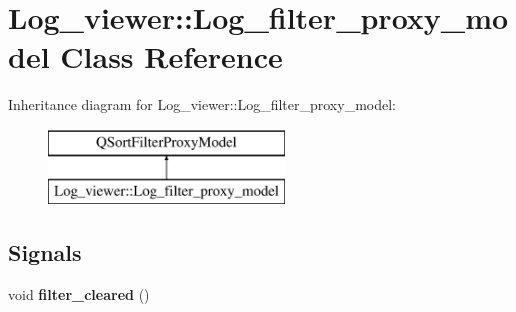 \hypertarget{class_log__viewer_1_1_log__filter__proxy__model}{\section{Log\-\_\-viewer\-:\-:Log\-\_\-filter\-\_\-proxy\-\_\-model Class Reference}
\label{class_log__viewer_1_1_log__filter__proxy__model}
}
Inheritance diagram for Log\-\_\-viewer\-:\-:Log\-\_\-filter\-\_\-proxy\-\_\-model\-:\begin{figure}[H]
\begin{center}
\leavevmode
\includegraphics[height=2.000000cm]{class_log__viewer_1_1_log__filter__proxy__model}
\end{center}
\end{figure}
\subsection*{Signals}
\begin{DoxyCompactItemize}
\item 
\hypertarget{class_log__viewer_1_1_log__filter__proxy__model_af2a3a3c7f11d3c54143bb7fc45d899de}{void {\bfseries filter\-\_\-cleared} ()}\label{class_log__viewer_1_1_log__filter__proxy__model_af2a3a3c7f11d3c54143bb7fc45d899de}

\end{DoxyCompactItemize}
